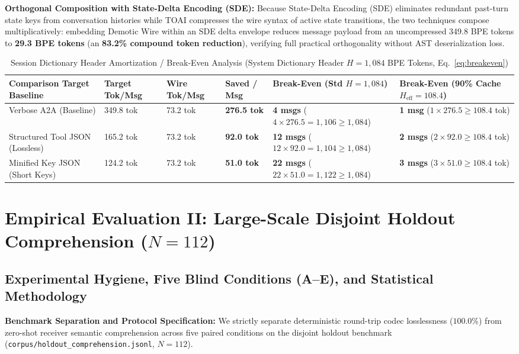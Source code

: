 \documentclass[9pt,a4paper]{extarticle}
\begin{document}
\textbf{Orthogonal Composition with State-Delta Encoding (SDE):} Because State-Delta Encoding (SDE) eliminates redundant past-turn state keys from conversation histories while TOAI compresses the wire syntax of active state transitions, the two techniques compose multiplicatively: embedding Demotic Wire within an SDE delta envelope reduces message payload from an uncompressed 349.8 BPE tokens to \textbf{29.3 BPE tokens} (an \textbf{83.2\% compound token reduction}), verifying full practical orthogonality without AST deserialization loss.


\begin{table}[h!]
\centering
\caption{Session Dictionary Header Amortization / Break-Even Analysis (System Dictionary Header $H = 1{,}084$ BPE Tokens, Eq.\ \ref{eq:breakeven})}
\label{tab:breakeven}
\footnotesize
\renewcommand{\arraystretch}{0.96}
\setlength{\tabcolsep}{2.5pt}
\begin{tabularx}{\textwidth}{L{3.7cm} R{1.9cm} R{1.9cm} R{1.9cm} R{2.4cm} Y}
\toprule
{}
\textbf{\color{white}Comparison Target Baseline} &
\textbf{\color{white}Target Tok/Msg} &
\textbf{\color{white}Wire Tok/Msg} &
\textbf{\color{white}Saved / Msg} &
\textbf{\color{white}Break-Even (Std $H=1{,}084$)} &
\textbf{\color{white}Break-Even (90\% Cache $H_{\text{eff}}=108.4$)} \\
\midrule
Verbose A2A (Baseline) & 349.8 tok & 73.2 tok & \textbf{276.5 tok} & \textbf{4 msgs} ($4 \times 276.5 = 1{,}106 \ge 1{,}084$) & \textbf{1 msg} ($1 \times 276.5 \ge 108.4$ tok) \\
Structured Tool JSON (Lossless) & 165.2 tok & 73.2 tok & \textbf{92.0 tok} & \textbf{12 msgs} ($12 \times 92.0 = 1{,}104 \ge 1{,}084$) & \textbf{2 msgs} ($2 \times 92.0 \ge 108.4$ tok) \\
Minified Key JSON (Short Keys) & 124.2 tok & 73.2 tok & \textbf{51.0 tok} & \textbf{22 msgs} ($22 \times 51.0 = 1{,}122 \ge 1{,}084$) & \textbf{3 msgs} ($3 \times 51.0 \ge 108.4$ tok) \\
\bottomrule
\end{tabularx}
\end{table}

\section{Empirical Evaluation II: Large-Scale Disjoint Holdout Comprehension ($N = 112$)}
\subsection{Experimental Hygiene, Five Blind Conditions (A--E), and Statistical Methodology}
\textbf{Benchmark Separation and Protocol Specification:} We strictly separate deterministic round-trip codec losslessness ($100.0\%$) from zero-shot receiver semantic comprehension across five paired conditions on the disjoint holdout benchmark (\texttt{corpus/holdout\_comprehension.jsonl}, $N=112$). 
\end{document}
